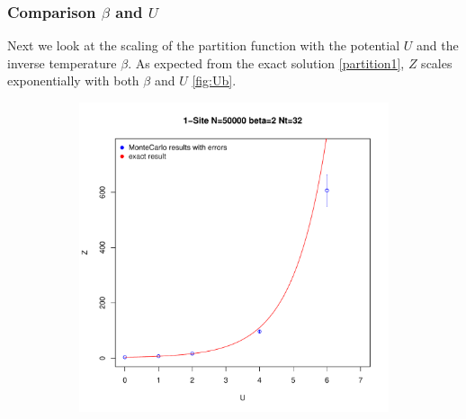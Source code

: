 \subsubsection{Comparison $\beta$ and $U$}
Next we look at the scaling of the partition function with the potential $U$ and the inverse temperature $\beta$.
As expected from the exact solution \eqref{partition1}, $Z$ scales exponentially with both $\beta$ and $U$ \ref{fig:Ub}. 
\begin{figure}
	\begin{subfigure}[c]{0.5\textwidth}
		
		\includegraphics[width=1\textwidth]{figs/plot_Z1U}
		

\end{subfigure}
\end{figure}

